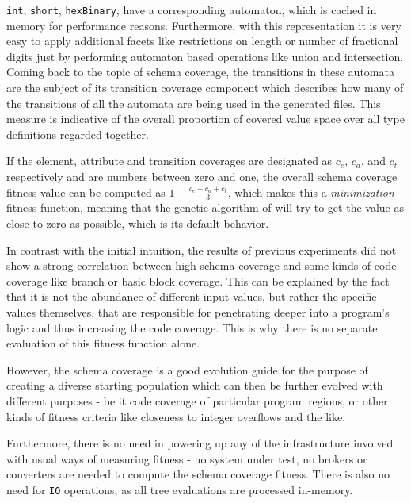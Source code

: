 \begin{description}
  \texttt{int}, \texttt{short}, \texttt{hexBinary}, have a corresponding automaton, which is cached in memory
  for performance reasons. Furthermore, with this representation it is very easy to apply additional facets
  like restrictions on length or number of fractional digits just by performing automaton based operations
  like union and intersection.
  Coming back to the topic of schema coverage, the transitions in these automata are the subject of its 
  transition coverage component which describes how many of the transitions of all the automata are being 
  used in the generated \xml files. This measure is indicative of the overall proportion of covered value space 
  over all type definitions regarded together.
\end{description}

If the element, attribute and transition coverages are designated as $c_e$, $c_a$, and $c_t$ respectively and
are numbers between zero and one, the overall schema coverage fitness value can be computed as $1 -
\frac{c_e+c_a+c_t}{3}$, which makes this a \emph{minimization} fitness function, meaning that the genetic
algorithm of \evosuite will try to get the value as close to zero as possible, which is its default behavior.

In contrast with the initial intuition, the results of previous experiments did not 
show a strong correlation between high schema coverage and some kinds of code coverage like 
branch or basic block coverage. This can be explained by the fact that it is not the abundance of different 
input values, but rather the specific values themselves, that are responsible for penetrating deeper into a 
program's logic and thus increasing the code coverage. This is why there is no separate evaluation of this
fitness function alone.

However, the schema coverage is a good evolution guide for the purpose of creating a diverse starting population
which can then be further evolved with different purposes - be it code coverage of particular program regions, or
other kinds of fitness criteria like closeness to integer overflows and the like.

Furthermore, there is no need in powering up any of the infrastructure involved with usual ways of measuring 
fitness - no system under test, no brokers or converters are needed to compute the schema coverage fitness. 
There is also no need for \texttt{IO} operations, as all \xml tree evaluations are processed in-memory.

